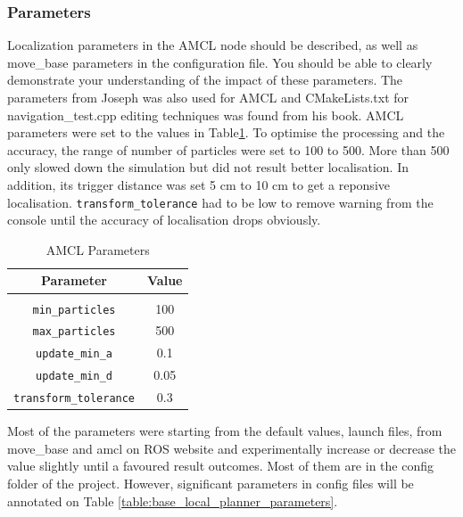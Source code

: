 \documentclass[10pt,journal,compsoc]{IEEEtran}
\begin{document}
\subsubsection{Parameters}
Localization parameters in the AMCL node should be described, as well as move\_base parameters in the configuration file. You should be able to clearly demonstrate your understanding of the impact of these parameters. The parameters from Joseph was also used for AMCL and CMakeLists.txt for navigation\_test.cpp editing techniques was found from his book.\cite{Joseph2015}
AMCL parameters were set to the values in Table\ref{table:AMCL_parameters}. To optimise the processing and the accuracy, the range of number of particles were set to 100 to 500. More than 500 only slowed down the simulation but did not result better localisation. In addition, its trigger distance was set 5 cm to 10 cm to get a reponsive localisation.
\verb!transform_tolerance! had to be low to remove warning from the console until the accuracy of localisation drops obviously.
\begin{table}[ht]
      \caption{AMCL Parameters}
      \label{table:AMCL_parameters}
      \begin{center}
      \begin{tabular}{|c|c|}
      \hline
      Parameter & Value \\
      \hline\hline \\
      \hline
      \verb!min_particles! &100 \\
      \hline
      \verb!max_particles! &500 \\
      \hline
      \verb!update_min_a! &0.1 \\
      \hline
      \verb!update_min_d! &0.05 \\
      \hline
      \verb!transform_tolerance! &0.3 \\
      \hline
      \end{tabular}
      \end{center}
\end{table}
Most of the parameters were starting from the default values, launch files, from move\_base and amcl on ROS website and experimentally increase or decrease the value slightly until a favoured result outcomes. Most of them are in the config folder of the project.\cite{AMCL_ROS} However, significant parameters in config files will be annotated on Table \ref{table:base_local_planner_parameters}.   
\end{document}
